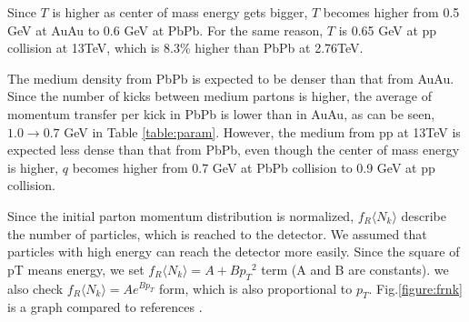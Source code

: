 \documentclass[%
 reprint,
 amsmath,amssymb,
 aps,
]{revtex4-2}
\begin{document}
Since $T$ is higher as center of mass energy gets bigger, $T$ becomes higher from 0.5 GeV at AuAu to 0.6 GeV at PbPb. 
For the same reason, $T$ is 0.65 GeV at pp collision at 13TeV, which is 8.3\% higher than PbPb at 2.76TeV.

The medium density from PbPb is expected to be denser than that from AuAu.
Since the number of kicks between medium partons is higher, the average of momentum transfer per kick in PbPb is lower than in AuAu,
as can be seen, $1.0 \rightarrow 0.7$ GeV in Table \ref{table:param}.
However, the medium from pp at 13TeV is expected less dense than that from PbPb, even though the center of mass energy is higher,
$q$ becomes higher from 0.7 GeV at PbPb collision to 0.9 GeV at pp collision. 




Since the initial parton momentum distribution is normalized, $f_R \langle N_k \rangle$ describe the number of particles,
which is reached to the detector.
We assumed that particles with high energy can reach the detector more easily.
Since the square of pT means energy, we set $f_R \langle N_k \rangle = A+B{p_T}^2$ term (A and B are constants).
we also check $f_R \langle N_k \rangle = Ae^{Bp_T}$ form, which is also proportional to $p_T$.
Fig.\ref{figure:frnk} is a graph compared to references \cite{Wong_1, PbPb}.
\end{document}
